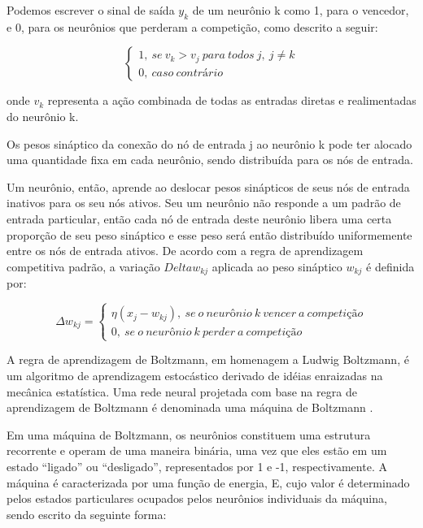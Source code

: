    Podemos escrever o sinal de saída $y_{k}$ de um neurônio k como 1, para o vencedor, e 0, para os neurônios que perderam a competição, como descrito a seguir:
    
    \begin{equation}
        \left\{\begin{array}{ll}1,\ se\ v_{k} > v_{j}\ para\ todos\ j,\ j \neq k\\0,\ caso\ contrário \end{array}\right.
    \end{equation}
    
    onde $v_{k}$ representa a ação combinada de todas as entradas diretas e realimentadas do neurônio k.
    
    Os pesos sináptico da conexão do nó de entrada j ao neurônio k pode ter alocado uma quantidade fixa em cada neurônio, sendo distribuída para os nós de entrada. 
    
    Um neurônio, então, aprende ao deslocar pesos sinápticos de seus nós de entrada inativos para os seu nós ativos. Seu um neurônio não responde a um padrão de entrada particular, então cada nó de entrada deste neurônio libera uma certa proporção de seu peso sináptico e esse peso será então distribuído uniformemente entre os nós de entrada ativos. De acordo com a regra de aprendizagem competitiva padrão, a variação $Delta w_{kj}$ aplicada ao peso sináptico $w_{kj}$ é definida por:
    
    \begin{equation} \label{eq:boltz}
        \Delta w_{kj} = \left\{\begin{array}{ll}\eta(x_{j} - w_{kj}),\ se\ o\ neurônio\ k\ vencer\ a\ competição\\0,\ se\ o\ neurônio\ k\ perder\ a\ competição \end{array}\right.
    \end{equation}
    
A regra de aprendizagem de Boltzmann, em homenagem a Ludwig Boltzmann, é um algoritmo de aprendizagem estocástico derivado de idéias enraizadas na mecânica estatística. Uma rede neural projetada com base na regra de aprendizagem de Boltzmann é denominada uma máquina de Boltzmann \cite{ackley1985learning}. 

Em uma máquina de Boltzmann, os neurônios constituem uma estrutura recorrente e operam de uma maneira binária, uma vez que eles estão em um estado ``ligado'' ou ``desligado'', representados por 1 e -1, respectivamente. A máquina é caracterizada por uma função de energia, E, cujo valor é determinado pelos estados particulares ocupados pelos neurônios individuais da máquina, sendo escrito da seguinte forma:
    
